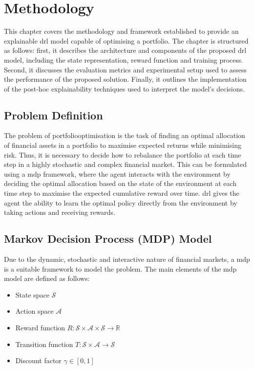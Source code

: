 \chapter{Methodology} \label{ch:methodology}

This chapter covers the methodology and framework established to provide an explainable \acrfull{drl} model capable of optimising a portfolio. The chapter is structured as follows: first, it describes the architecture and components of the proposed \acrshort{drl} model, including the state representation, reward function and training process. Second, it discusses the evaluation metrics and experimental setup used to assess the performance of the proposed solution. Finally, it outlines the implementation of the post-hoc explainability techniques used to interpret the model's decisions. 

\section{Problem Definition} \label{sec:problem-definition}

The problem of \gls{portfoliooptimisation} is the task of finding an optimal allocation of financial assets in a portfolio to maximise expected returns while minimising risk. Thus, it is necessary to decide how to rebalance the portfolio at each time step in a highly stochastic and complex financial market. This can be formulated using a \acrfull{mdp} framework, where the agent interacts with the environment by deciding the optimal allocation based on the state of the environment at each time step to maximise the expected cumulative reward over time. \acrfull{drl} gives the agent the ability to learn the optimal policy directly from the environment by taking actions and receiving rewards. 

\section{Markov Decision Process (MDP) Model} \label{sec:mdp-model}

Due to the dynamic, stochastic and interactive nature of financial markets, a \acrlong{mdp} is a suitable framework to model the problem. The main elements of the \acrshort{mdp} model are defined as follows:
\begin{itemize}
    \item State space $\mathcal{S}$
    \item Action space $\mathcal{A}$
    \item Reward function $R: \mathcal{S} \times \mathcal{A} \times \mathcal{S} \to \mathbb{R}$
    \item Transition function $T: \mathcal{S} \times \mathcal{A} \to \mathcal{S}$
    \item Discount factor $\gamma \in [0,1]$
\end{itemize}

